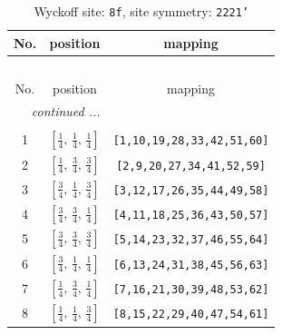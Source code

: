 \documentclass[fleqn,8pt]{jsarticle}
\begin{document}
\begin{longtable}{ccc}
\caption{Wyckoff site: {\tt 8f}, site symmetry: {\tt 2221'}}
 \\
 \hline \hline
No. & position & mapping \\ \hline \endfirsthead

\multicolumn{2}{l}{\tablename\ \thetable{}} \\
 \hline \hline
No. & position & mapping \\ \hline \endhead

 \hline \hline
\multicolumn{2}{r}{\footnotesize\it continued ...} \\ \endfoot

 \hline \hline
\multicolumn{2}{r}{} \\ \endlastfoot

1 & $\left[ \frac{1}{4},\, \frac{1}{4},\, \frac{1}{4} \right]$ & {\tt [1,10,19,28,33,42,51,60]} \\ \hline
2 & $\left[ \frac{1}{4},\, \frac{3}{4},\, \frac{3}{4} \right]$ & {\tt [2,9,20,27,34,41,52,59]} \\ \hline
3 & $\left[ \frac{3}{4},\, \frac{1}{4},\, \frac{3}{4} \right]$ & {\tt [3,12,17,26,35,44,49,58]} \\ \hline
4 & $\left[ \frac{3}{4},\, \frac{3}{4},\, \frac{1}{4} \right]$ & {\tt [4,11,18,25,36,43,50,57]} \\ \hline
5 & $\left[ \frac{3}{4},\, \frac{3}{4},\, \frac{3}{4} \right]$ & {\tt [5,14,23,32,37,46,55,64]} \\ \hline
6 & $\left[ \frac{3}{4},\, \frac{1}{4},\, \frac{1}{4} \right]$ & {\tt [6,13,24,31,38,45,56,63]} \\ \hline
7 & $\left[ \frac{1}{4},\, \frac{3}{4},\, \frac{1}{4} \right]$ & {\tt [7,16,21,30,39,48,53,62]} \\ \hline
8 & $\left[ \frac{1}{4},\, \frac{1}{4},\, \frac{3}{4} \right]$ & {\tt [8,15,22,29,40,47,54,61]} \\
\end{longtable}
\renewcommand{\arraystretch}{1.2}
\end{document}
